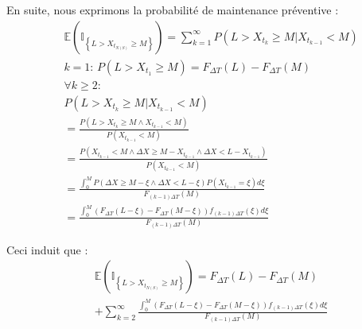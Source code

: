 \documentclass[10pt,a4paper]{article}
\begin{document}
En suite, nous exprimons la probabilité de maintenance préventive :
\begin{align*}
    & \mathbb{E}\left( {{\mathbb{I}_{\left\{ {L > {X_{{t_{N\left( S \right)}}}} \geqslant M} \right\}}}} \right) = \sum\limits_{k = 1}^\infty  {P\left( {L > {X_{{t_k}}} \geqslant M|{X_{{t_{k - 1}}}} < M} \right)} \\
    & k = 1 :\, P\left( {L > {X_{{t_1}}} \geqslant M} \right) = {F_{\Delta T}}\left( L \right) - {F_{\Delta T}}\left( M \right) \\
    & \forall k \geqslant 2 : \\
    & P\left( {L > {X_{{t_k}}} \geqslant M|{X_{{t_{k - 1}}}} < M} \right) \\
    & = \frac{{P\left( {L > {X_{{t_k}}} \geqslant M \wedge {X_{{t_{k - 1}}}} < M} \right)}}{{P\left( {{X_{{t_{k - 1}}}} < M} \right)}} \\
    & = \frac{{P\left( {{X_{{t_{k - 1}}}} < M \wedge \Delta X \geqslant M - {X_{{t_{k - 1}}}} \wedge \Delta X < L - {X_{{t_{k - 1}}}}} \right)}}{{P\left( {{X_{{t_{k - 1}}}} < M} \right)}} \\
    & = \frac{{\int_0^M {P\left( {\Delta X \geqslant M - \xi  \wedge \Delta X < L - \xi } \right)P\left( {{X_{{t_{k - 1}}}} = \xi } \right)d\xi } }}{{{F_{\left( {k - 1} \right)\Delta T}}\left( M \right)}} \\
    & = \frac{{\int_0^M {\left( {{F_{\Delta T}}\left( {L - \xi } \right) - {F_{\Delta T}}\left( {M - \xi } \right)} \right){f_{\left( {k - 1} \right)\Delta T}}\left( \xi  \right)d\xi } }}{{{F_{\left( {k - 1} \right)\Delta T}}\left( M \right)}}
\end{align*}

Ceci induit que :
\begin{align}
    \label{p_p_de}
    & \mathbb{E}\left( {{\mathbb{I}_{\left\{ {L > {X_{{t_{N\left( S \right)}}}} \geqslant M} \right\}}}} \right) = {F_{\Delta T}}\left( L \right) - {F_{\Delta T}}\left( M \right) \nonumber \\
    & + \sum\limits_{k = 2}^\infty  {\frac{{\int_0^M {\left( {{F_{\Delta T}}\left( {L - \xi } \right) - {F_{\Delta T}}\left( {M - \xi } \right)} \right){f_{\left( {k - 1} \right)\Delta T}}\left( \xi  \right)d\xi } }}{{{F_{\left( {k - 1} \right)\Delta T}}\left( M \right)}}}
\end{align}
\end{document}
